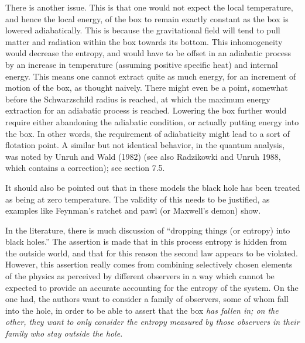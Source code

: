 There is another issue.  This is that one would not expect the local
temperature, and hence the local energy, of the box to remain exactly constant
as the box is lowered adiabatically.  This is because the gravitational field
will tend to pull matter and radiation within the box towards its bottom.  This
inhomogeneity would decrease the entropy, and would have to be offset  in an
adiabatic process by an increase in temperature (assuming positive specific
heat) and internal energy.  This means one cannot extract quite as
much energy, for an increment of motion of the box,
as thought naively.  There might
even be a point, somewhat before the Schwarzschild
radius is reached, at which the maximum energy extraction for an adiabatic
process is reached. Lowering the box further would require either abandoning
the adiabatic condition, or actually putting energy into the box.  In other
words, the requirement of adiabaticity might lead to a sort of flotation
point.  A similar but not identical behavior, in the quantum analysis, was
noted by Unruh and Wald (1982) (see also Radzikowki and Unruh 1988, which
contains a correction); see section 7.5.

It should also be pointed out that in these models the black hole has been
treated as being at zero temperature.  The validity of this needs to be
justified, as examples like Feynman's ratchet and pawl (or Maxwell's demon)
show.

In the literature, there is much discussion of ``dropping things (or entropy)
into black holes.''  The assertion is made that in this process entropy is
hidden from the outside world, and that for this reason the second law appears
to be violated.  However, this assertion really comes from combining
selectively chosen elements of the physics as perceived by  different observers
in a way which cannot be expected to provide an accurate accounting for the
entropy of the system.  On the one had, the authors want to consider a family
of observers, some of whom fall into the hole, in order to be able to assert
that the box \it has \rm fallen in; on the other, they want to only consider
the entropy measured by those observers in their family who stay outside the
hole.

